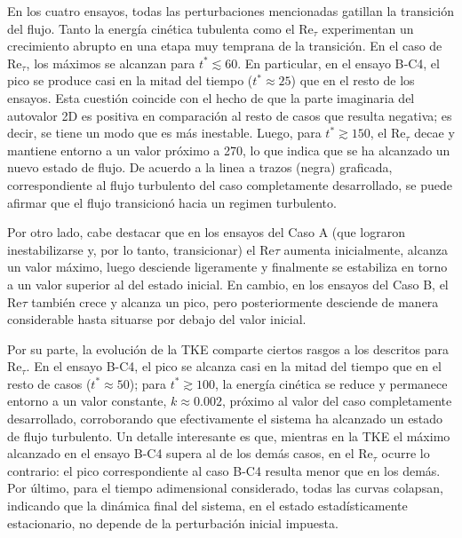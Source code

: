 En los cuatro ensayos, todas las perturbaciones mencionadas gatillan la transición del flujo. Tanto la energía cinética tubulenta como el Re$_{\tau}$ experimentan un crecimiento abrupto en una etapa muy temprana de la transición. En el caso de Re$_{\tau}$, los máximos se alcanzan para $t^*\lesssim 60$. En particular, en el ensayo B‑C4, el pico se produce casi en la mitad del tiempo ($t^*\approx 25$) que en el resto de los ensayos. Esta cuestión coincide con el hecho de que la parte imaginaria del autovalor 2D es positiva en comparación al resto de casos que resulta negativa; es decir, se tiene un modo que es más inestable. Luego, para $t^* \gtrsim 150$, el Re$_{\tau}$ decae y mantiene entorno a un valor próximo a 270, lo que indica que se ha alcanzado un nuevo estado de flujo. De acuerdo a la linea a trazos (negra) graficada, correspondiente al flujo turbulento del caso completamente desarrollado, se puede afirmar que el flujo transicionó hacia un regimen turbulento.  


Por otro lado, cabe destacar que en los ensayos del Caso A (que lograron inestabilizarse y, por lo tanto, transicionar) el Re${\tau}$ aumenta inicialmente, alcanza un valor máximo, luego desciende ligeramente y finalmente se estabiliza en torno a un valor superior al del estado inicial. En cambio, en los ensayos del Caso B, el Re${\tau}$ también crece y alcanza un pico, pero posteriormente desciende de manera considerable hasta situarse por debajo del valor inicial.

Por su parte, la evolución de la TKE comparte ciertos rasgos a los descritos para Re$_{\tau}$. En el ensayo B-C4, el pico se alcanza casi en la mitad del tiempo que en el resto de casos ($t^*\approx 50$); para $t^* \gtrsim 100$, la energía cinética se reduce y permanece entorno a un valor constante, $k \approx 0\text{.}002$, próximo al valor del caso completamente desarrollado, corroborando que efectivamente el sistema ha alcanzado un estado de flujo turbulento. Un detalle interesante es que, mientras en la TKE el máximo alcanzado en el ensayo B-C4 supera al de los demás casos, en el Re$_{\tau}$ ocurre lo contrario: el pico correspondiente al caso B-C4 resulta menor que en los demás. Por último, para el tiempo adimensional considerado, todas las curvas colapsan, indicando que la dinámica final del sistema, en el estado estadísticamente estacionario, no depende de la perturbación inicial impuesta. 

